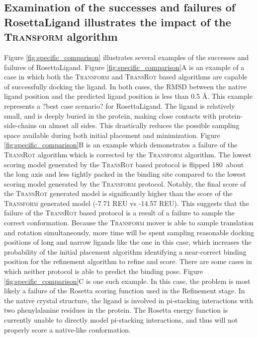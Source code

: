 \subsection{Examination of the successes and failures of RosettaLigand illustrates the impact of the \textsc{Transform} algorithm}
Figure \ref{fig:specific_comparison} illustrates several examples of the successes and failures of RosettaLigand.
Figure \ref{fig:specific_comparison}A is an example of a case in which both the \textsc{Transform} and \textsc{TransRot} based algorithms are capable of successfully docking the ligand.
In both cases, the RMSD between the native ligand position and the predicted ligand position is less than 0.5 \AA.  This example represents a ?best case scenario? for RosettaLigand.
The ligand is relatively small, and is deeply buried in the protein, making close contacts with protein-side-chains on almost all sides.
This drastically reduces the possible sampling space available during both initial placement and minimization.
Figure \ref{fig:specific_comparison}B is an example which demonstrates a failure of the \textsc{TransRot} algorithm which is corrected by the \textsc{Transform} algorithm.
The lowest scoring model generated by the \textsc{TransRot} based protocol is flipped 180\textdegree\ about the long axis and less tightly packed in the binding site compared to the lowest scoring model generated by the \textsc{Transform} protocol.
Notably, the final score of the \textsc{TransRot} generated model is significantly higher than the score of the \textsc{Transform} generated model (-7.71 REU vs -14.57 REU). 
This suggests that the failure of the \textsc{TransRot} based protocol is a result of a failure to sample the correct conformation.
Because the \textsc{Transform} mover is able to sample translation and rotation simultaneously, more time will be spent sampling reasonable docking positions of long and narrow ligands like the one in this case, which increases the probability of the initial placement algorithm identifying a near-correct binding position for the refinement algorithm to refine and score.
There are some cases in which neither protocol is able to predict the binding pose.
Figure \ref{fig:specific_comparison}C is one such example.  In this case, the problem is most likely a failure of the Rosetta scoring function used in the Refinement stage.
In the native crystal structure, the ligand is involved in pi-stacking interactions with two phenylalanine residues in the protein.
The Rosetta energy function is currently unable to directly model pi-stacking interactions, and thus will not properly score a native-like conformation. 

